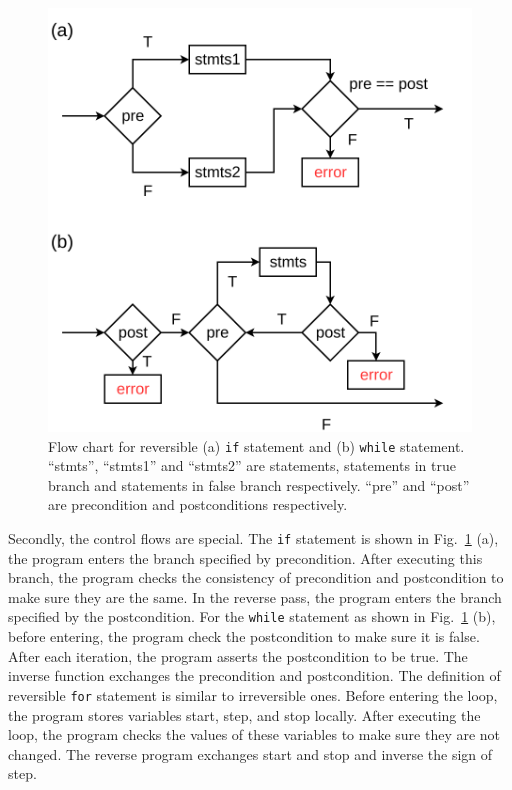 \documentclass[aps,twocolumn,longbibliography,english,superscriptaddress]{revtex4-1}
\newcommand{\<}{\langle}
\renewcommand{\>}{\rangle}
\newcommand{\Fig}[1]{Fig.~\ref{#1}}
\theoremstyle{definition}\newtheorem{definition}{\textit{Definition}}
\begin{document}
\begin{figure}
    \centerline{\includegraphics[width=0.8\columnwidth,trim={0 0cm 0 0cm},clip]{images/controlflow.pdf}}
    \caption{Flow chart for reversible (a) \texttt{if} statement and (b) \texttt{while} statement. ``stmts'', ``stmts1'' and ``stmts2'' are statements, statements in true branch and statements in false branch respectively. ``pre'' and ``post'' are precondition and postconditions respectively.}\label{fig:controlflow}
\end{figure}
Secondly, the control flows are special.
The \texttt{if} statement is shown in \Fig{fig:controlflow} (a), the program enters the branch specified by precondition. After executing this branch, the program checks the consistency of precondition and postcondition to make sure they are the same. In the reverse pass, the program enters the branch specified by the postcondition.
For the \texttt{while} statement as shown in \Fig{fig:controlflow} (b), before entering, the program check the postcondition to make sure it is false.
After each iteration, the program asserts the postcondition to be true. The inverse function exchanges the precondition and postcondition.
The definition of reversible \texttt{for} statement is similar to irreversible ones.
Before entering the loop, the program stores variables start, step, and stop locally. After executing the loop, the program checks the values of these variables to make sure they are not changed. The reverse program exchanges start and stop and inverse the sign of step.
\end{document}
